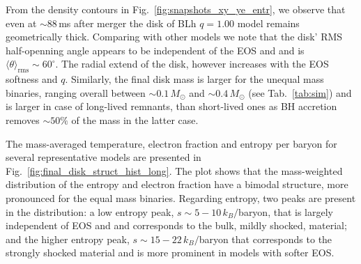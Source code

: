 %
From the density contours in Fig.~\ref{fig:snapshots_xy_ye_entr}, 
we observe that even at ${\sim}88\,$ms after merger the disk
of BLh $q=1.00$ model remains geometrically thick. 
Comparing with other models we note that 
the disk' \ac{RMS} half-openning angle appears to be independent of the 
\ac{EOS} and \mr{} and is $\langle\theta\rangle_{\text{rms}}\sim60^{\circ}$. 
The radial extend of the disk, however increases with the \ac{EOS} softness and $q$.
%
Similarly, the final disk mass is larger for the unequal mass binaries, 
ranging overall between ${\sim}0.1\,M_{\odot}$ and ${\sim}0.4\,M_{\odot}$
(see Tab.~\ref{tab:sim}) and is larger in case of long-lived remnants, 
than short-lived ones as \ac{BH} accretion removes ${\sim}50\%$ 
of the mass in the latter case.
%
%
%

%
The mass-averaged temperature, electron fraction and entropy per baryon
for several representative models are presented in Fig.~\ref{fig:final_disk_struct_hist_long}.
%
The plot shows that the mass-weighted distribution of the entropy and electron 
fraction have a bimodal structure, more pronounced for the 
equal mass binaries. 
Regarding entropy, two peaks are present in the distribution:
a low entropy peak, $s\sim5-10\,k_B/$baryon, that is largely independent of 
\ac{EOS} and \mr{} and corresponds to the bulk, mildly shocked, material;
and the higher entropy peak, $s\sim15-22\,k_B/$baryon that corresponds to 
the strongly shocked material and is more prominent 
in models with softer \ac{EOS}. 
%

